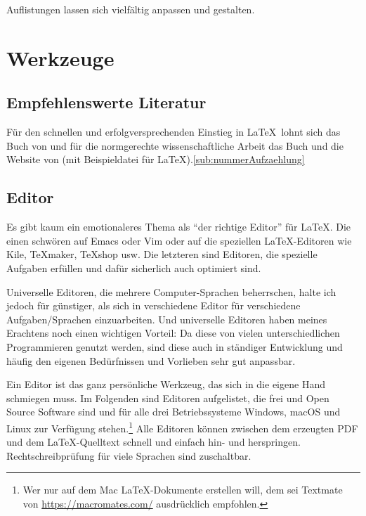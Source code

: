 \documentclass[12pt,	%
				headings=small,		%
				toc=bibliography,	%
			]	%
{scrreprt}		%
\begin{document}
			Auflistungen lassen sich vielfältig anpassen und gestalten.\autocite{schlosser}
	
	

\chapter{Werkzeuge}
\label{cha:werkzeuge}
\section{Empfehlenswerte Literatur}
	\label{sec:literaturempfehlung}
	Für den schnellen und erfolgversprechenden Einstieg in \LaTeX\ lohnt sich das Buch von \textcite{schlosser} und für die normgerechte wissenschaftliche Arbeit das Buch und die Website von \textcite{scholz}(mit Beispieldatei für \LaTeX\autocite{scholz:latexvorlage}).\ref{sub:nummerAufzaehlung}
\section{Editor}
\label{sec:editor}
	Es gibt kaum ein emotionaleres Thema als \enquote{der richtige Editor} für \LaTeX. Die einen schwören auf \textsf{Emacs} oder \textsf{Vim} oder auf die speziellen \LaTeX-Editoren wie \textsf{Kile}, \textsf{\TeX{}maker}, \textsf{\TeX{}shop} usw. 
	Die letzteren sind Editoren, die spezielle Aufgaben erfüllen und dafür sicherlich auch optimiert sind. 
	
	Universelle Editoren, die mehrere Computer-Sprachen beherrschen, halte ich jedoch für günstiger, als sich in verschiedene Editor für verschiedene Aufgaben/Sprachen einzuarbeiten. Und universelle Editoren haben meines Erachtens noch einen wichtigen Vorteil: Da diese von vielen unterschiedlichen Programmieren genutzt werden, sind diese auch in ständiger Entwicklung und häufig den eigenen Bedürfnissen und Vorlieben sehr gut anpassbar.

	Ein Editor ist das ganz persönliche Werkzeug, das sich in die eigene Hand schmiegen muss.  Im Folgenden sind Editoren aufgelistet, die frei und Open Source Software sind und für alle drei Betriebssysteme Windows, macOS und Linux zur Verfügung stehen.\footnote{Wer nur auf dem Mac \LaTeX-Dokumente erstellen will, dem sei Textmate von \href{https://macromates.com/}{https://macromates.com/} ausdrücklich empfohlen.} Alle Editoren können zwischen dem erzeugten PDF und dem \LaTeX-Quelltext schnell und einfach hin- und herspringen. Rechtschreibprüfung für viele Sprachen sind zuschaltbar.
\end{document}
